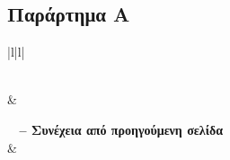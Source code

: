 \documentclass[12pt,a4paper,final]{article}
\begin{document}
\begin{landscape}
\section*{Παράρτημα Α} 

\begin{center}
\begin{longtable}{|l|l|}
\caption{Τίτλοι Μαθημάτων των Π3 και Π4 προγραμμάτων σπουδών με τα αντίστοιχά τους στο Π5.} \label{tab:long} \\

\hline {} &  \\ \hline 
\endfirsthead

{{\bfseries \tablename\ \thetable{} -- Συνέχεια από προηγούμενη σελίδα}} \\
\hline {} &  \\ \hline 
\endhead


\hline {} \\ \hline
\endfoot

\hline \hline
\endlastfoot


\end{longtable}
\end{center}
\end{landscape}
\end{document}
